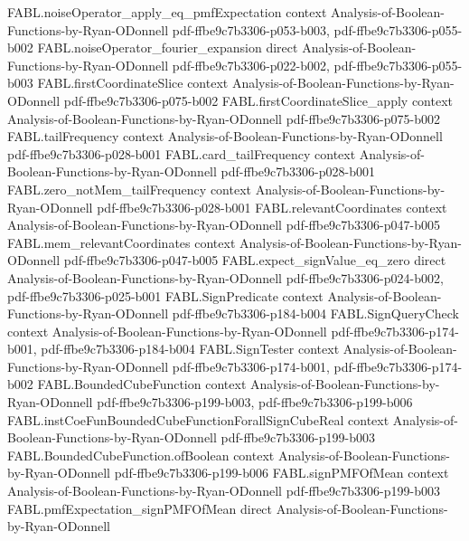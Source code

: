 \begin{theorem}
  {FABL.noiseOperator_apply_eq_pmfExpectation}
  {context}
  {Analysis-of-Boolean-Functions-by-Ryan-ODonnell}
  {pdf-ffbe9c7b3306-p053-b003,
    pdf-ffbe9c7b3306-p055-b002}
\proofstep
  {FABL.noiseOperator_fourier_expansion}
  {direct}
  {Analysis-of-Boolean-Functions-by-Ryan-ODonnell}
  {pdf-ffbe9c7b3306-p022-b002,
    pdf-ffbe9c7b3306-p055-b003}
\proofstep
  {FABL.firstCoordinateSlice}
  {context}
  {Analysis-of-Boolean-Functions-by-Ryan-ODonnell}
  {pdf-ffbe9c7b3306-p075-b002}
\proofstep
  {FABL.firstCoordinateSlice_apply}
  {context}
  {Analysis-of-Boolean-Functions-by-Ryan-ODonnell}
  {pdf-ffbe9c7b3306-p075-b002}
\proofstep
  {FABL.tailFrequency}
  {context}
  {Analysis-of-Boolean-Functions-by-Ryan-ODonnell}
  {pdf-ffbe9c7b3306-p028-b001}
\proofstep
  {FABL.card_tailFrequency}
  {context}
  {Analysis-of-Boolean-Functions-by-Ryan-ODonnell}
  {pdf-ffbe9c7b3306-p028-b001}
\proofstep
  {FABL.zero_notMem_tailFrequency}
  {context}
  {Analysis-of-Boolean-Functions-by-Ryan-ODonnell}
  {pdf-ffbe9c7b3306-p028-b001}
\proofstep
  {FABL.relevantCoordinates}
  {context}
  {Analysis-of-Boolean-Functions-by-Ryan-ODonnell}
  {pdf-ffbe9c7b3306-p047-b005}
\proofstep
  {FABL.mem_relevantCoordinates}
  {context}
  {Analysis-of-Boolean-Functions-by-Ryan-ODonnell}
  {pdf-ffbe9c7b3306-p047-b005}
\proofstep
  {FABL.expect_signValue_eq_zero}
  {direct}
  {Analysis-of-Boolean-Functions-by-Ryan-ODonnell}
  {pdf-ffbe9c7b3306-p024-b002,
    pdf-ffbe9c7b3306-p025-b001}
\proofstep
  {FABL.SignPredicate}
  {context}
  {Analysis-of-Boolean-Functions-by-Ryan-ODonnell}
  {pdf-ffbe9c7b3306-p184-b004}
\proofstep
  {FABL.SignQueryCheck}
  {context}
  {Analysis-of-Boolean-Functions-by-Ryan-ODonnell}
  {pdf-ffbe9c7b3306-p174-b001,
    pdf-ffbe9c7b3306-p184-b004}
\proofstep
  {FABL.SignTester}
  {context}
  {Analysis-of-Boolean-Functions-by-Ryan-ODonnell}
  {pdf-ffbe9c7b3306-p174-b001,
    pdf-ffbe9c7b3306-p174-b002}
\proofstep
  {FABL.BoundedCubeFunction}
  {context}
  {Analysis-of-Boolean-Functions-by-Ryan-ODonnell}
  {pdf-ffbe9c7b3306-p199-b003,
    pdf-ffbe9c7b3306-p199-b006}
\proofstep
  {FABL.instCoeFunBoundedCubeFunctionForallSignCubeReal}
  {context}
  {Analysis-of-Boolean-Functions-by-Ryan-ODonnell}
  {pdf-ffbe9c7b3306-p199-b003}
\proofstep
  {FABL.BoundedCubeFunction.ofBoolean}
  {context}
  {Analysis-of-Boolean-Functions-by-Ryan-ODonnell}
  {pdf-ffbe9c7b3306-p199-b006}
\proofstep
  {FABL.signPMFOfMean}
  {context}
  {Analysis-of-Boolean-Functions-by-Ryan-ODonnell}
  {pdf-ffbe9c7b3306-p199-b003}
\proofstep
  {FABL.pmfExpectation_signPMFOfMean}
  {direct}
  {Analysis-of-Boolean-Functions-by-Ryan-ODonnell}

\end{theorem}
